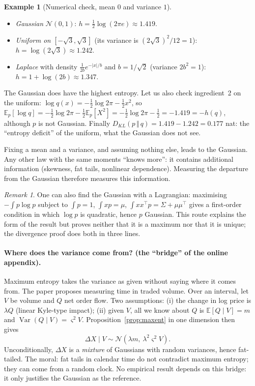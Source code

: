 \documentclass[11pt]{article}
\theoremstyle{plain}
\theoremstyle{definition}
\newtheorem{exemple}[proposition]{Example}
\theoremstyle{remark}
\newtheorem*{remarque}{Remark}
\newcommand{\E}{\mathbb{E}}
\newcommand{\N}{\mathcal{N}}
\newcommand{\KL}[2]{D_{KL}\!\left(#1\,\Vert\,#2\right)}
\begin{document}
\begin{exemple}[Numerical check, mean $0$ and variance $1$]
\leavevmode
\begin{itemize}
\item \emph{Gaussian} $\N(0,1)$: $h=\tfrac12\log(2\pi e)\approx1.419$.
\item \emph{Uniform on $[-\sqrt3,\sqrt3]$} (its variance is
$(2\sqrt3)^2/12=1$): $h=\log(2\sqrt3)\approx1.242$.
\item \emph{Laplace} with density $\frac{1}{2b}e^{-|x|/b}$ and $b=1/\sqrt2$
(variance $2b^2=1$): $h=1+\log(2b)\approx1.347$.
\end{itemize}
The Gaussian does have the highest entropy. Let us also check ingredient~2 on
the uniform: $\log q(x)=-\tfrac12\log2\pi-\tfrac12x^2$, so
$\E_p[\log q]=-\tfrac12\log2\pi-\tfrac12\E_p[X^2]
=-\tfrac12\log2\pi-\tfrac12=-1.419=-h(q)$, although $p$ is not Gaussian.
Finally $\KL{p}{q}=1.419-1.242=0.177$ nat: the ``entropy deficit'' of the
uniform, what the Gaussian does not see.
\end{exemple}

\begin{intuition}
Fixing a mean and a variance, and assuming nothing else, leads to the
Gaussian. Any other law with the same moments ``knows more'': it contains
additional information (skewness, fat tails, nonlinear dependence). Measuring
the departure from the Gaussian therefore measures this information.
\end{intuition}

\begin{remarque}
One can also find the Gaussian with a Lagrangian: maximising $-\int p\log p$
subject to $\int p=1$, $\int xp=\mu$, $\int xx^\top p=\Sigma+\mu\mu^\top$ gives
a first-order condition in which $\log p$ is quadratic, hence $p$ Gaussian.
This route explains the form of the result but proves neither that it is a
maximum nor that it is unique; the divergence proof does both in three lines.
\end{remarque}

\paragraph{Where does the variance come from? (the ``bridge'' of the online appendix).}
Maximum entropy takes the variance as given without saying where it comes
from. The paper proposes measuring time in traded volume. Over an interval,
let $V$ be volume and $Q$ net order flow. Two assumptions: (i) the change in
log price is $\lambda Q$ (linear Kyle-type impact); (ii) given $V$, all we
know about $Q$ is $\E[Q\mid V]=m$ and $\operatorname{Var}(Q\mid V)=\varsigma^2V$.
Proposition~\ref{prop:maxent} in one dimension then gives
\[
\Delta X\mid V\sim\N(\lambda m,\ \lambda^2\varsigma^2V).
\]
Unconditionally, $\Delta X$ is a \emph{mixture} of Gaussians with random
variances, hence fat-tailed. The moral: fat tails in calendar time do not
contradict maximum entropy; they can come from a random clock. No empirical
result depends on this bridge: it only justifies the Gaussian as the
reference.
\end{document}
